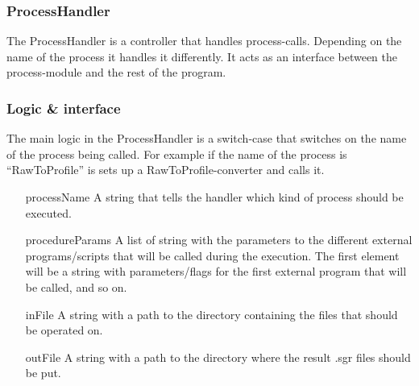 \subsubsection{ProcessHandler}
The ProcessHandler is a controller that handles process-calls. Depending on the name of the process it handles it differently. It acts as an interface between the process-module and the rest of the program. 


\subsubsection{Logic \& interface}
The main logic in the ProcessHandler is a switch-case that switches on the name of the process being called. For example if the name of the process is “RawToProfile” is sets up a RawToProfile-converter and calls it. 

\begin{itemize}
\item[processName] A string that tells the handler which kind of process should be executed.
\item[procedureParams] A list of string with the parameters to the different external  programs/scripts that will be called during the execution. The first element will be a string with parameters/flags for the first external program that will be called, and so on.
\item[inFile] A string with a path to the directory containing the files that should be operated on.
\item[outFile] A string with a path to the directory where the result .sgr files should be put.

\end{itemize}



